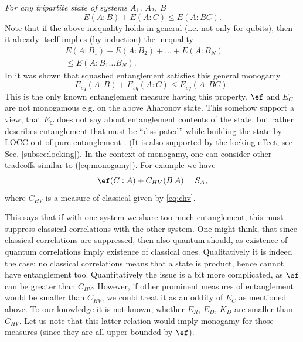 \documentclass[rmp,12pt,preprint]{revtex4-2}
\begin{document}
{\it For any tripartite state of systems $A_1$,  $A_2$, $B$}
\begin{equation}
E(A:B) + E(A:C) \leq E(A:BC).
\label{eq:monogamy}
\end{equation}
Note that if the above inequality holds in general (i.e. not only for
qubits), then it already itself implies (by induction) the inequality
\begin{eqnarray}
  E(A:B_1) + E(A:B_2) + \ldots + E(A:B_N) \qquad \nonumber \\
  \leq E(A:B_1\ldots B_N).
\end{eqnarray}
In \cite{KoashiW-monogamy} it was shown that squashed entanglement
satisfies this general monogamy
\begin{equation}
E_{sq}(A:B) + E_{sq}(A:C) \leq E_{sq}(A:BC).
\label{eq:monogamy-sq}
\end{equation}
This is the only known entanglement measure having this property.
$\ef$ and $E_C$ are not monogamous \cite{CoffmanKW-tangle,KoashiW-monogamy}
e.g. on the above Aharonov state. This somehow support a view, that
$E_C$ does not say about entanglement contents of the state, but
rather describes entanglement that must be ``dissipated'' while
building the state by LOCC out of pure entanglement
\cite{thermo-ent2002,SynakHH04}. (It is also supported by the locking effect, see Sec. \ref{subsec:locking}). In the context of monogamy, one can
consider other tradeoffs similar to (\ref{eq:monogamy}). For example
we have \cite{KoashiW-monogamy}
\begin{equation}
\ef(C:A) + C_{HV}(B\>A) = S_A,
\end{equation}
where $C_{HV}$ is a measure of classical \cite{HendersonVedral} given
by \ref{eq:chv}.

This says that if with one system we share too much entanglement, this
must suppress classical correlations with the other system. One might
think, that since classical correlations are suppressed, then also
quantum should, as existence of quantum correlations imply existence
of classical ones. Qualitatively it is indeed the case: no classical
correlations means that a state is product, hence cannot have
entanglement too. Quantitatively the issue is a bit more complicated,
as $\ef$ can be greater than $C_{HV}$. However, if other prominent
measures of entanglement would be smaller than $C_{HV}$, we could
treat it as an oddity of $E_C$ as mentioned above.  To our knowledge
it is not known, whether $E_R$, $E_D$, $K_D$ are smaller
than $C_{HV}$. Let us note that this latter relation would imply
monogamy for those measures (since they are all upper bounded by
$\ef$).
\end{document}
